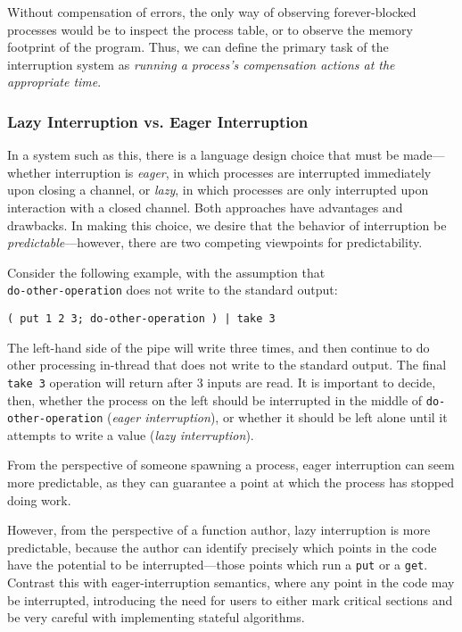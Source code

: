 \ifsigpro{ \documentclass[english,PRO]{ipsj} }
\begin{document}
Without compensation of errors, the only way of observing forever-blocked processes would be to inspect the process table, or to observe the memory footprint of the program. Thus, we can define the primary task of the interruption system as \emph{running a process's compensation actions at the appropriate time}.

\subsubsection{Lazy Interruption vs. Eager Interruption}\label{lazy-interruption}\noindent
In a system such as this, there is a language design choice that must be made---whether interruption is \emph{eager}, in which processes are interrupted immediately upon closing a channel, or \emph{lazy}, in which processes are only interrupted upon interaction with a closed channel. Both approaches have advantages and drawbacks. In making this choice, we desire that the behavior of interruption be \emph{predictable}---however, there are two competing viewpoints for predictability.

Consider the following example, with the assumption that \\ \verb/do-other-operation/ does not write to the standard output:
\begin{lstlisting}
( put 1 2 3; do-other-operation ) | take 3
\end{lstlisting}

\noindent
The left-hand side of the pipe will write three times, and then continue to do other processing in-thread that does not write to the standard output.
The final \verb/take 3/ operation will return after 3 inputs are read.
It is important to decide, then, whether the process on the left should be interrupted in the middle of \verb/do-other-operation/ (\emph{eager interruption}), or whether it should be left alone until it attempts to write a value (\emph{lazy interruption}).

From the perspective of someone spawning a process, eager interruption can seem more predictable, as they can guarantee a point at which the process has stopped doing work.

However, from the perspective of a function author, lazy interruption is more predictable, because the author can identify precisely which points in the code have the potential to be interrupted---those points which run a \verb/put/ or a \verb/get/. Contrast this with eager-interruption semantics, where any point in the code may be interrupted, introducing the need for users to either mark critical sections and be very careful with implementing stateful algorithms.
\end{document}
